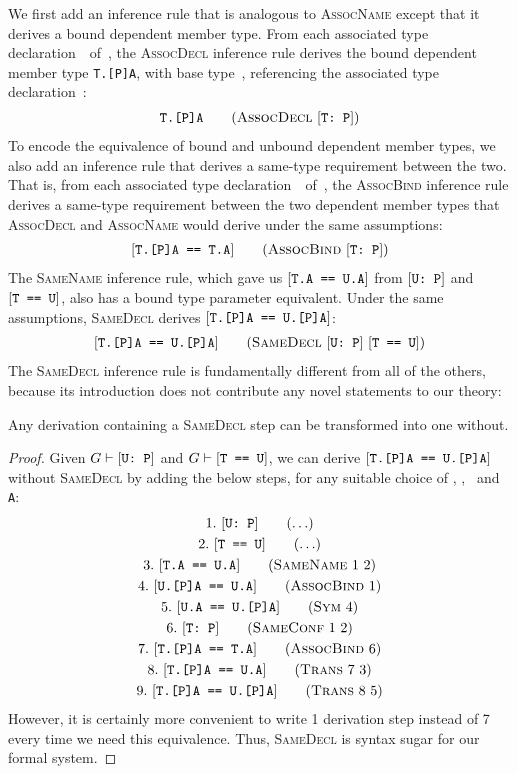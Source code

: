 \documentclass[../generics]{subfiles}
\begin{document}
We first add an inference rule that is analogous to \textsc{AssocName} except that it derives a bound dependent member type. From each associated type declaration~\nA\ of~\tP, the \textsc{AssocDecl} inference rule derives the bound dependent member type \texttt{T.[P]A}, with base type~\tT, referencing the associated type declaration~\nA:
\begin{gather*}
\AssocDeclStepDef
\end{gather*}
To encode the equivalence of bound and unbound dependent member types, we also add an inference rule that derives a same-type requirement between the two. That is, from each associated type declaration~\nA\ of~\tP, the \textsc{AssocBind} inference rule derives a same-type requirement between the two dependent member types that \textsc{AssocDecl} and \textsc{AssocName} would derive under the same assumptions:
\begin{gather*}
\AssocBindStepDef
\end{gather*}
The \textsc{SameName} inference rule, which gave us $[\texttt{T.A == U.A}]$ from $[\texttt{U:~P}]$ and $[\texttt{T == U}]$, also has a bound type parameter equivalent. Under the same assumptions, \textsc{SameDecl} derives $[\texttt{T.[P]A == U.[P]A}]$:
\begin{gather*}
\SameDeclStepDef
\end{gather*}
The \textsc{SameDecl} inference rule is fundamentally different from all of the others, because its introduction does not contribute any novel statements to our theory:
\begin{proposition}
Any derivation containing a \textsc{SameDecl} step can be transformed into one without.
\end{proposition}
\begin{proof}
Given $G\vdash[\texttt{U:~P}]$ and $G\vdash[\texttt{T == U}]$, we can derive $[\texttt{T.[P]A == U.[P]A}]$ without \textsc{SameDecl} by adding the below steps, for any suitable choice of \tT, \tU, \tP\ and \texttt{A}:
\begin{gather*}
\AnyStep{\ConfReq{U}{P}}{1}\\
\AnyStep{\TU}{2}\\
\SameNameStep{1}{2}{T.A}{U.A}{3}\\
\AssocBindStep{1}{U.[P]A}{U.A}{4}\\
\SymStep{4}{U.A}{U.[P]A}{5}\\
\SameConfStep{1}{2}{T}{P}{6}\\
\AssocBindStep{6}{T.[P]A}{T.A}{7}\\
\TransStep{7}{3}{T.[P]A}{U.A}{8}\\
\TransStep{8}{5}{T.[P]A}{U.[P]A}{9}
\end{gather*}
However, it is certainly more convenient to write 1 derivation step instead of 7 every time we need this equivalence. Thus, \textsc{SameDecl} is syntax sugar for our formal system.
\end{proof}
\end{document}

